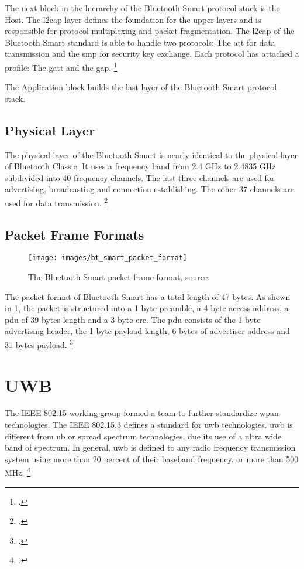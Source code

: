 The next block in the hierarchy of the Bluetooth Smart protocol stack is the Host. The \gls{l2cap} layer defines the foundation for the upper layers and is responsible for protocol multiplexing and packet fragmentation. The \gls{l2cap} of the Bluetooth Smart standard is able to handle two protocols: The \gls{att} for data transmission and the \gls{smp} for security key exchange. Each protocol has attached a profile: The \gls{gatt} and the \gls{gap}. \footcite[Cf.][25-33]{Townsend2014}

The Application block builds the last layer of the Bluetooth Smart protocol stack.

\subsection{Physical Layer}

The physical layer of the Bluetooth Smart is nearly identical to the physical layer of Bluetooth Classic. It uses a frequency band from 2.4 GHz to 2.4835 GHz subdivided into 40 frequency channels. The last three channels are used for advertising, broadcasting and connection establishing. The other 37 channels are used for data transmission. \footcite[Cf.][16-17]{Townsend2014}

\subsection{Packet Frame Formats}

\begin{figure}[ht]
  \centering
  \texttt{[image: images/bt\_smart\_packet\_format]}
  \caption{The Bluetooth Smart packet frame format, source: \cite[174]{Minoli2013}}
  \label{fig:bt_smart_packet_format}
\end{figure}

The packet format of Bluetooth Smart has a total length of 47 bytes. As shown in \cref{fig:bt_smart_packet_format}, the packet is structured into a 1 byte preamble, a 4 byte access address, a \gls{pdu} of 39 bytes length and a 3 byte \gls{crc}. The \gls{pdu} consists of the 1 byte advertising header, the 1 byte payload length, 6 bytes of advertiser address and 31 bytes payload. \footcite[Cf.][174]{Minoli2013}

\section{UWB}
\label{sec:uwb}

The IEEE 802.15 working group formed a team to further standardize \gls{wpan} technologies. The IEEE 802.15.3 defines a standard for \gls{uwb} technologies. \gls{uwb} is different from \gls{nb} or spread spectrum technologies, due its use of a ultra wide band of spectrum. In general, \gls{uwb} is defined to any radio frequency transmission system using more than 20 percent of their baseband frequency, or more than 500 MHz. \footcite[Cf.][145-146]{Lau2009}

